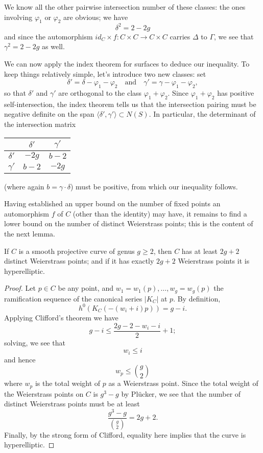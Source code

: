 We know all the other pairwise intersection number of these classes: the ones involving $\varphi_1$ or $\varphi_2$ are obvious; we have
$$
\delta^2 = 2 - 2g
$$
and since the automorphism $id_C \times f : C\times C \to C \times C$ carries $\Delta$ to $\Gamma$, we see that $\gamma^2 = 2-2g$ as well.

We can now apply the index theorem for surfaces to deduce our inequality. To keep things relatively simple, let's introduce two new classes: set
$$
\delta' = \delta - \varphi_1 - \varphi_2 \quad \text{and} \quad \gamma' = \gamma - \varphi_1 - \varphi_2,
$$
so that $\delta'$ and $\gamma'$ are orthogonal to the class $\varphi_1 + \varphi_2$. Since $\varphi_1 + \varphi_2$ has positive self-intersection, the index theorem tells us that the intersection pairing must be negative definite on the span $\langle \delta',\gamma' \rangle \subset N(S)$. In particular, the determinant of the intersection matrix


\begin{center}
\begin{tabular}{c|c|c}
& $\delta'$ &  $\gamma'$  \\
\hline
$\delta'$ & $-2g$ & $b-2$ \\
\hline
$\gamma'$ & $b-2$ & $-2g$ 
\end{tabular}
\end{center}
(where again $b = \gamma \cdot \delta$) must be positive, from which our inequality follows.

Having established an upper bound on the number of fixed points an automorphism $f$ of $C$ (other than the identity) may have, it remains to find a lower bound on the number of distinct Weierstrass points; this is the content of the next lemma.


\begin{lemma}
If $C$ is a smooth projective curve of genus $g \geq 2$, then $C$ has at least $2g+2$ distinct Weierstrass points; and if it has exactly $2g+2$ Weierstrass points it is hyperelliptic.
\end{lemma}

\begin{proof}
Let $p \in C$ be any point, and $w_1=w_1(p),\dots,w_g = w_g(p)$ the ramification sequence of the canonical series $|K_C|$ at $p$. By definition, 
$$
h^0(K_C(-(w_i+i)p)) = g - i.
$$
Applying Clifford's theorem we have
$$
g-i \leq \frac{2g - 2 - w_i - i}{2} + 1;
$$
solving, we see that
$$
w_i \leq i
$$
and hence
$$
w_p \leq \binom{g}{2}
$$
where $w_p$ is the total weight of $p$ as a Weierstrass point. Since the total weight of the Weierstrass points on $C$ is $g^3-g$ by Pl\"ucker, we see that the number of distinct Weierstrass points must be at least
$$
\frac{g^3-g}{\binom{g}{2}} = 2g+2.
$$
Finally, by the strong form of Clifford, equality here implies that the curve is hyperelliptic.
\end{proof}




